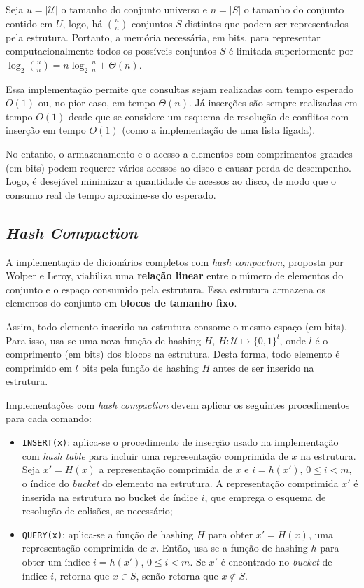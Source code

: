 \documentclass[12pt,twoside,english,brazilian]{book}
\begin{document}
Seja $u = |\mathcal{U}|$ o tamanho do conjunto universo e $n=|S|$ o tamanho do conjunto contido em $U$, logo, há $\binom{u}{n}$ conjuntos $S$ distintos que podem ser representados pela estrutura. Portanto, a memória necessária, em bits, para representar computacionalmente todos os possíveis conjuntos $S$ é limitada superiormente por $\log_2 \binom{u}{n} = n \log_2 \frac{u}{n} + \Theta(n)$.

Essa implementação permite que consultas sejam realizadas com tempo esperado $O(1)$ ou, no pior caso, em tempo $\Theta(n)$. Já inserções são sempre realizadas em tempo $O(1)$ desde que se considere um esquema de resolução de conflitos com inserção em tempo $O(1)$ (como a implementação de uma lista ligada).

No entanto, o armazenamento e o acesso a elementos com comprimentos grandes (em bits) podem requerer vários acessos ao disco e causar perda de desempenho. Logo, é desejável minimizar a quantidade de acessos ao disco, de modo que o consumo real de tempo aproxime-se do esperado.

\subsection{\textit{Hash Compaction}}

A implementação de dicionários completos com \textit{hash compaction}, proposta por Wolper e Leroy, viabiliza uma \textbf{relação linear} entre o número de elementos do conjunto e o espaço consumido pela estrutura. Essa estrutura armazena os elementos do conjunto em \textbf{blocos de tamanho fixo}.

Assim, todo elemento inserido na estrutura consome o mesmo espaço (em bits). Para isso, usa-se uma nova função de hashing $H$, $H: \mathcal{U} \mapsto \{0, 1\}^l$, onde $l$ é o comprimento (em bits) dos blocos na estrutura. Desta forma, todo elemento é comprimido em $l$ bits pela função de hashing $H$ antes de ser inserido na estrutura.

Implementações com \textit{hash compaction} devem aplicar os seguintes procedimentos para cada comando:

\begin{itemize}
    \item \texttt{INSERT(x)}: aplica-se o procedimento de inserção usado na implementação com \textit{hash table} para incluir uma representação comprimida de $x$ na estrutura. Seja $x' = H(x)$ a representação comprimida de $x$ e $i = h(x')$, $0 \leq i < m$, o índice do \textit{bucket} do elemento na estrutura. A representação comprimida $x'$ é inserida na estrutura no bucket de índice $i$, que emprega o esquema de resolução de colisões, se necessário;
    \item \texttt{QUERY(x)}: aplica-se a função de hashing $H$ para obter $x' = H(x)$, uma representação comprimida de $x$. Então, usa-se a função de hashing $h$ para obter um índice $i = h(x')$, $0 \leq i < m$. Se $x'$ é encontrado no \textit{bucket} de índice $i$, retorna que $x \in S$, senão retorna que $x \notin S$.
\end{itemize}
\end{document}
